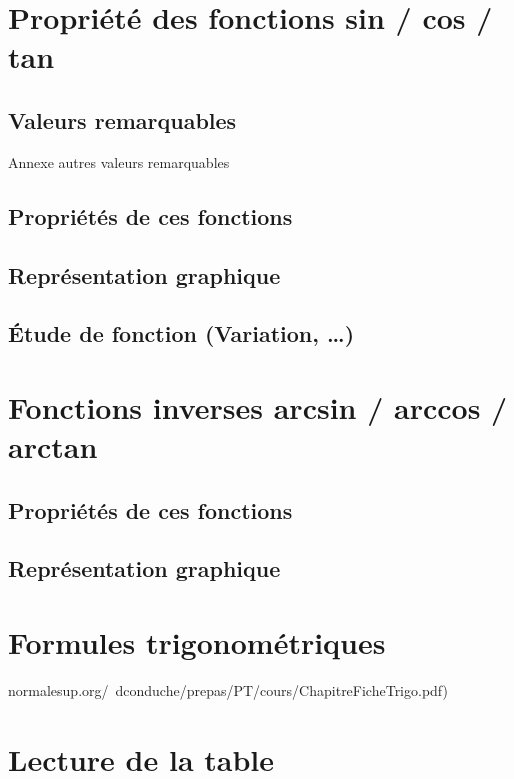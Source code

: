 \documentclass[a4paper]{article}
\begin{document}
	\section{Propriété des fonctions sin / cos / tan}

		\subsection{Valeurs remarquables}

			Annexe autres valeurs remarquables 

		\subsection{Propriétés de ces fonctions}

		\subsection{Représentation graphique}

		\subsection{Étude de fonction (Variation, …)}

	\section{Fonctions inverses arcsin / arccos / arctan}

		\subsection{Propriétés de ces fonctions}

		\subsection{Représentation graphique}

	\section{Formules trigonométriques}

		normalesup.org/~dconduche/prepas/PT/cours/ChapitreFicheTrigo.pdf)

	\section{Lecture de la table}
\end{document}
